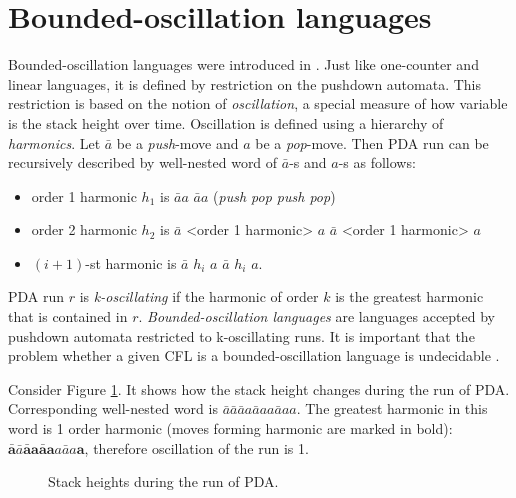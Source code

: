\section{Bounded-oscillation languages}
\label{sec:osc}
Bounded-oscillation languages were introduced in \cite{BoundOsc}. Just like one-counter and linear languages, it is defined by restriction on the pushdown automata. This restriction is based on the notion of \textit{oscillation}, a special measure of how variable is the stack height over time. Oscillation is defined using a hierarchy of \textit{harmonics}. Let $\bar{a}$ be a \textit{push}-move and $a$ be a \textit{pop}-move. Then PDA run can be recursively described by well-nested word of $\bar{a}$-s and $a$-s as follows:
\begin{itemize}
\item  order 1 harmonic $h_1$ is $\bar{a}a$ $\bar{a}a$ (\textit{push pop push pop})
\item  order 2 harmonic $h_2$ is $\bar{a}$ <order 1 harmonic> $a$ $\bar{a}$ <order 1 harmonic> $a$
\item  $(i+1)$-st harmonic is $\bar{a}$ $h_i$ $a$ $\bar{a}$ $h_i$ $a$.
\end{itemize}


PDA run $r$ is \textit{k-oscillating} if the harmonic of order $k$ is the greatest harmonic that is contained in $r$. \textit{Bounded-oscillation languages} are languages accepted by pushdown automata restricted to k-oscillating runs. It is important that the problem whether a given CFL is a bounded-oscillation language is undecidable \cite{BoundOsc}.
\begin{example}
Consider Figure \ref{oscb}. It shows how the stack height changes during the run of PDA. Corresponding well-nested word is $\bar{a}\bar{a}\bar{a}a\bar{a}aa\bar{a}aa$. The greatest harmonic in this word is 1 order harmonic (moves forming harmonic are marked in bold): $\mathbf{\bar{a}}\bar{a}\mathbf{\bar{a}a}\mathbf{\bar{a}a}a\bar{a}a\mathbf{a}$, therefore oscillation of the run is 1.
\end{example}
\begin{figure}
\caption{Stack heights during the run of PDA.}
\label{oscb}
\end{figure}


